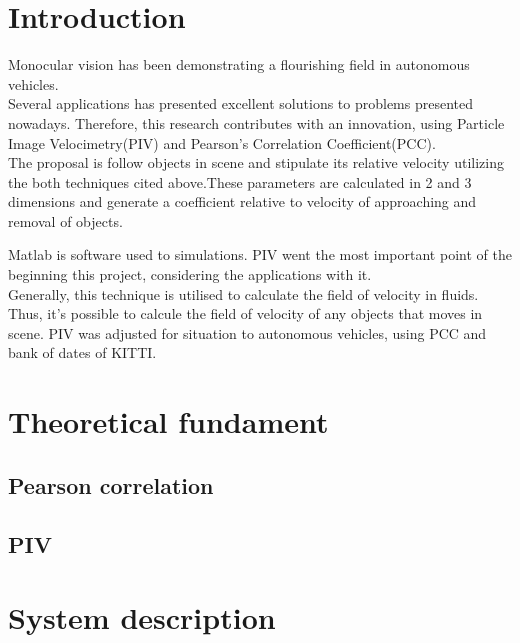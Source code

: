 \documentclass[a4paper,10pt]{article}
\title{}
\author{}
\date{}
\begin{document}
\maketitle

\begin{abstract}

\end{abstract}

\section{Introduction}
Monocular vision has been demonstrating a flourishing field in autonomous vehicles.\\ Several applications has presented excellent 
solutions to problems presented nowadays. Therefore, this research contributes with an innovation, using Particle Image 
Velocimetry(PIV)\cite{Bastiaans} and Pearson's Correlation Coefficient(PCC)\cite{Miranda Neto}.\\ The proposal is follow objects in scene and
stipulate its relative velocity utilizing the both techniques cited above.These parameters are calculated in 2 and 3 dimensions and
generate a coefficient relative to velocity of approaching and removal of objects.

Matlab is software used to simulations. PIV went the most important point of the beginning this project, considering the applications 
with it.\\ Generally, this technique is utilised to calculate the field of velocity in fluids. Thus, it's possible to calcule the field
of velocity of any objects that moves in scene. PIV was adjusted for situation to autonomous vehicles, using PCC and bank of dates of 
KITTI\cite{Geiger}.

\section{Theoretical fundament}
\subsection{Pearson correlation}
\subsection{PIV}

\section{System description}
\end{document}
